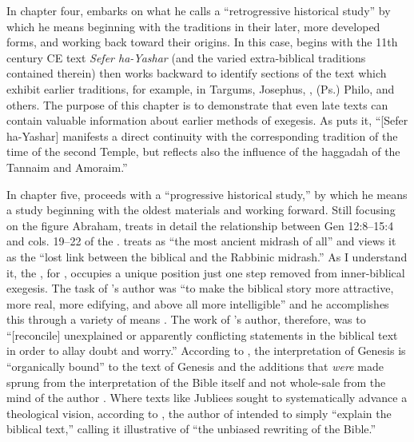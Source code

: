  In chapter four, \vermes embarks on what he calls a ``retrogressive historical study'' by which he means beginning with the traditions in their later, more developed forms, and working back toward their origins. In this case, \vermes begins with the 11th century CE text \emph{Sefer ha-Yashar} (and the varied extra-biblical traditions contained therein) then works backward to identify sections of the text which exhibit earlier traditions, for example, in Targums, Josephus, \jub, (Ps.) Philo, and others. The purpose of this chapter is to demonstrate that even late texts can contain valuable information about earlier methods of exegesis. As \vermes puts it, ``{[}Sefer ha-Yashar{]} manifests a direct continuity with the corresponding tradition of the time of the second Temple, but reflects also the influence of the haggadah of the Tannaim and Amoraim.''\autocite[95]{vermes1961} 

 In chapter five, \vermes proceeds with a ``progressive historical study,'' by which he means a study beginning with the oldest materials and working forward. Still focusing on the figure Abraham, \vermes treats in detail the relationship between Gen 12:8--15:4 and cols. 19--22 of the \ga. \vermes treats \ga as ``the most ancient midrash of all''\autocite[124]{vermes1961} and views it as the ``lost link between the biblical and the Rabbinic midrash.'' \autocite[124]{vermes1961} As I understand it, the \ga, for \vermes, occupies a unique position just one step removed from inner-biblical exegesis. The task of \ga's author was ``to make the biblical story more attractive, more real, more edifying, and above all more intelligible'' and he accomplishes this through a variety of means \autocite[125]{vermes1961}. The work of \ga's author, therefore, was to ``{[}reconcile{]} unexplained or apparently conflicting statements in the biblical text in order to allay doubt and worry.''\autocite[125]{vermes1961} According to \vermes, the interpretation of Genesis is ``organically bound'' to the text of Genesis and the additions that \emph{were} made sprung from the interpretation of the Bible itself and not whole-sale from the mind of the author \autocite[126]{vermes1961}. Where texts like Jubliees sought to systematically advance a theological vision, according to \vermes, the author of \ga intended to simply ``explain the biblical text,'' calling it illustrative of ``the unbiased rewriting of the Bible.''\autocite[126]{vermes1961} 

